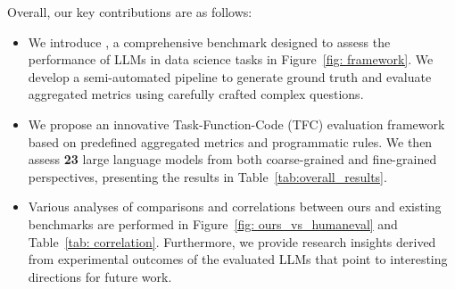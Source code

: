 Overall, our key contributions are as follows:
\begin{itemize}[leftmargin=*,itemsep=0pt,parsep=0.5em,topsep=0.3em,partopsep=0.3em]
    \item We introduce \benchmark, a comprehensive benchmark designed to assess the performance of LLMs in data science tasks in Figure~\ref{fig: framework}. We develop a semi-automated pipeline to generate ground truth and evaluate aggregated metrics using carefully crafted complex questions.
    \item We propose an innovative Task-Function-Code (TFC) evaluation framework based on predefined aggregated metrics and programmatic rules. We then assess \textbf{23} large language models from both coarse-grained and fine-grained perspectives, presenting the results in Table~\ref{tab:overall_results}.
    \item Various analyses of comparisons and correlations between ours and existing benchmarks are performed in Figure~\ref{fig: ours_vs_humaneval} and Table~\ref{tab: correlation}. Furthermore, we provide research insights derived from experimental outcomes of the evaluated LLMs that point to interesting directions for future work.
\end{itemize}

